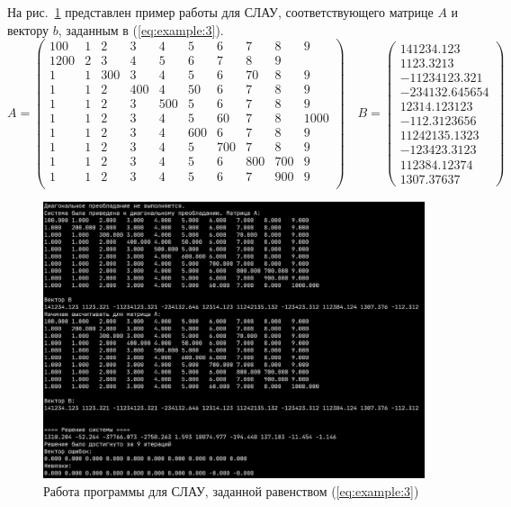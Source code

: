 На рис.~\ref{fig:example:3} представлен пример работы для СЛАУ, соответствующего матрице \(A\) и вектору \(b\), заданным в (\ref{eq:example:3}).
\begin{equation}
	A = \begin{pmatrix}
		100   & 1 & 2   & 3   & 4   & 5   & 6   & 7   & 8   & 9    \\
		1 200 & 2 & 3   & 4   & 5   & 6   & 7   & 8   & 9          \\
		1     & 1 & 300 & 3   & 4   & 5   & 6   & 70  & 8   & 9    \\
		1     & 1 & 2   & 400 & 4   & 50  & 6   & 7   & 8   & 9    \\
		1     & 1 & 2   & 3   & 500 & 5   & 6   & 7   & 8   & 9    \\
		1     & 1 & 2   & 3   & 4   & 5   & 60  & 7   & 8   & 1000 \\
		1     & 1 & 2   & 3   & 4   & 600 & 6   & 7   & 8   & 9    \\
		1     & 1 & 2   & 3   & 4   & 5   & 700 & 7   & 8   & 9    \\
		1     & 1 & 2   & 3   & 4   & 5   & 6   & 800 & 700 & 9    \\
		1     & 1 & 2   & 3   & 4   & 5   & 6   & 7   & 900 & 9    \\
	\end{pmatrix}
	\quad
	B = \begin{pmatrix}
		141234.123     \\
		1123.3213      \\
		-11234123.321  \\
		-234132.645654 \\
		12314.123123   \\
		-112.3123656   \\
		11242135.1323  \\
		-123423.3123   \\
		112384.12374   \\
		1307.37637
	\end{pmatrix}
	\label{eq:example:3}
\end{equation}

\begin{figure}[H]
	\includegraphics[width=\textwidth]{./img/test3.png}
	\caption{Работа программы для СЛАУ, заданной равенством (\ref{eq:example:3})}
	\label{fig:example:3}
\end{figure}

